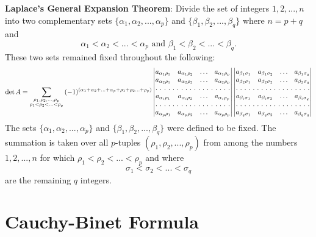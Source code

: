 {\bf Laplace's General Expansion Theorem}:
Divide the set of integers ${1,2,...,n}$ into two complementary sets $\{\alpha_1, \alpha_2, ..., \alpha_p\}$ and $\{ \beta_1, \beta_2, ..., \beta_q\}$ where $n = p + q$ and
$$\alpha_1 < \alpha_2 < ... < \alpha_p \mbox{ and } \beta_1 < \beta_2 < ... < \beta_q.$$ These two sets remained fixed throughout the following:
\begin{equation}
\det A = \sum_{\substack{\rho_1, \rho_2, ...,\rho_p \\ \rho_1 < \rho_2 < ... < \rho_p}} \, (-1)^{(\alpha_1 + \alpha_2 + ... + \alpha_p + \rho_1 + \rho_2 ... + \rho_p)}
\begin{vmatrix}
a_{\alpha_1\rho_1} & a_{\alpha_1\rho_2}  & \hdots & a_{\alpha_1\rho_p}  \\
a_{\alpha_2\rho_1} & a_{\alpha_2\rho_2}  & \hdots & a_{\alpha_2\rho_p}  \\
\hdotsfor[2]{4}\\
a_{\alpha_i\rho_1} & a_{\alpha_i\rho_2}  & \hdots & a_{\alpha_i\rho_p}  \\
\hdotsfor[2]{4}\\
a_{\alpha_p\rho_1} & a_{\alpha_p\rho_2}  & \hdots & a_{\alpha_p\rho_p}  \\
\end{vmatrix}
\begin{vmatrix}
a_{\beta_1\sigma_1} & a_{\beta_1\sigma_2}  & \hdots & a_{\beta_1\sigma_q}  \\
a_{\beta_2\sigma_1} & a_{\beta_2\sigma_2}  & \hdots & a_{\beta_2\sigma_q}  \\
\hdotsfor[2]{4}\\
a_{\beta_i\sigma_1} & a_{\beta_i\sigma_2}  & \hdots & a_{\beta_i\sigma_q}  \\
\hdotsfor[2]{4}\\
a_{\beta_q\sigma_1} & a_{\beta_q\sigma_2}  & \hdots & a_{\beta_q\sigma_q}  \\
\end{vmatrix}
\end{equation}
 The sets $\{\alpha_1, \alpha_2, ..., \alpha_p\}$ and $\{ \beta_1, \beta_2, ..., \beta_q\}$  were defined to be fixed. 
 The summation is taken over all $p$-tuples $(\rho_1, \rho_2, ..., \rho_p)$ from among the numbers $1,2,...,n$ for which $\rho_1 < \rho_2 < ... < \rho_p$ and where 
 $$\sigma_1 < \sigma_2 < ... < \sigma_q$$ are the remaining $q$ integers.\\
 

\section{Cauchy-Binet Formula}

